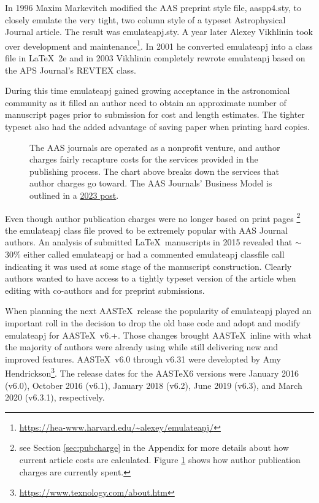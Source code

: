 \documentclass[linenumbers,trackchanges]{aastex701}
\newcommand\aastex{AAS\TeX}
\newcommand\latex{La\TeX}
\begin{document}
In 1996 Maxim Markevitch modified the AAS preprint style file, aaspp4.sty,
to closely emulate the very tight, two column style of a typeset
Astrophysical Journal article.  The result was emulateapj.sty. A year
later Alexey Vikhlinin took over development and maintenance\footnote{\url{https://hea-www.harvard.edu/~alexey/emulateapj/}}. In 2001 he
converted emulateapj into a class file in \latex\ 2e and in 2003 Vikhlinin
completely rewrote emulateapj based on the APS Journal's REVTEX class.

During this time emulateapj gained growing acceptance in the astronomical
community as it filled an author need to obtain an approximate number of
manuscript pages prior to submission for cost and length estimates. The
tighter typeset also had the added advantage of saving paper when printing 
hard copies.

\begin{figure}[ht!]
\caption{The AAS journals are operated as a nonprofit venture, and author charges fairly recapture costs for the services provided in the publishing process. The chart above breaks down the services that author charges go toward. The AAS Journals' Business Model is outlined in a \href{https://aas.org/posts/news/2023/08/aas-open-access-publishing-model-open-transparent-and-fair}{2023 post}.
\label{fig:general}}
\end{figure}

Even though author publication charges were no longer based on print pages
\footnote{see Section \ref{sec:pubcharge} in the Appendix for more details
about how current article costs are calculated. Figure \ref{fig:general} shows
how author publication charges are currently spent.} the emulateapj class file
proved to be extremely popular with AAS Journal authors.  An 
analysis of submitted \latex\ manuscripts in 2015 revealed that $\sim$30\%
either called emulateapj or had a commented emulateapj classfile call
indicating it was used at some stage of the manuscript construction.
Clearly authors wanted to have access to a tightly typeset version of the
article when editing with co-authors and for preprint submissions.

When planning the next \aastex\ release the popularity of emulateapj played
an important roll in the decision to drop the old base code and adopt and
modify emulateapj for \aastex\ v6.+.  Those changes brought \aastex\
inline with what the majority of authors were already using while still
delivering new and improved features.  \aastex\ v6.0 through v6.31 were
developted by Amy Hendrickson\footnote{\url{https://www.texnology.com/about.htm}}.
The release dates for the \aastex 6 versions were January 2016 (v6.0),
October 2016 (v6.1), January 2018 (v6.2), June 2019 (v6.3), and March 2020
(v6.3.1), respectively.
\end{document}
